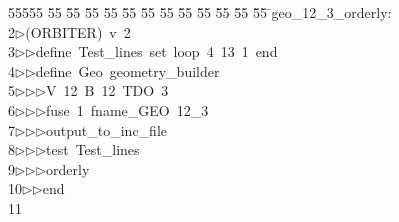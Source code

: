 %
%
\begin{tabbing}
55555 \= 55 \= 55 \= 55 \= 55 \= 55 \= 55 \= 55 \= 55 \= 55 \= 55 \= 55 \= 55 \= \>geo\_12\_3\_orderly:\\[0pt]
2\>$\triangleright$\>(ORBITER)\ v\ 2\ \\[0pt]
3\>$\triangleright$\>$\triangleright$\>define\ Test\_lines\ set\ loop\ 4\ 13\ 1\ end\ \\[0pt]
4\>$\triangleright$\>$\triangleright$\>define\ Geo\ geometry\_builder\ \\[0pt]
5\>$\triangleright$\>$\triangleright$\>$\triangleright$\>V\ 12\ B\ 12\ TDO\ 3\ \\[0pt]
6\>$\triangleright$\>$\triangleright$\>$\triangleright$\>fuse\ 1\ fname\_GEO\ 12\_3\ \\[0pt]
7\>$\triangleright$\>$\triangleright$\>$\triangleright$\>output\_to\_inc\_file\ \\[0pt]
8\>$\triangleright$\>$\triangleright$\>$\triangleright$\>test\ Test\_lines\ \\[0pt]
9\>$\triangleright$\>$\triangleright$\>$\triangleright$\>orderly\ \\[0pt]
10\>$\triangleright$\>$\triangleright$\>end\\[0pt]
11\>\end{tabbing}
